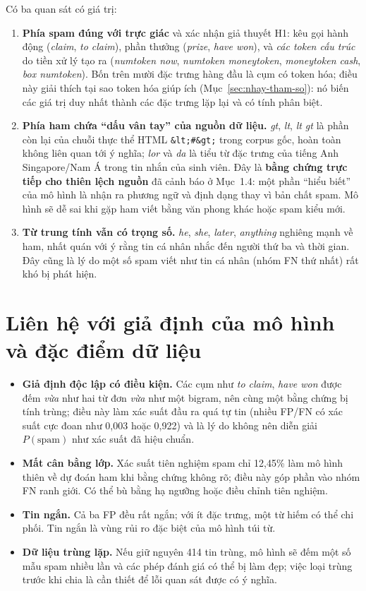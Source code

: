 Có ba quan sát có giá trị:

\begin{enumerate}[label=(\arabic*)]
    \item \textbf{Phía spam đúng với trực giác} và xác nhận giả thuyết H1: kêu gọi hành động (\textit{claim}, \textit{to claim}), phần thưởng (\textit{prize}, \textit{have won}), và \textit{các token cấu trúc} do tiền xử lý tạo ra (\textit{numtoken now}, \textit{numtoken moneytoken}, \textit{moneytoken cash}, \textit{box numtoken}). Bốn trên mười đặc trưng hàng đầu là cụm có token hóa; điều này giải thích tại sao token hóa giúp ích (Mục~\ref{sec:nhay-tham-so}): nó biến các giá trị duy nhất thành các đặc trưng lặp lại và có tính phân biệt.
    \item \textbf{Phía ham chứa ``dấu vân tay'' của nguồn dữ liệu.} \textit{gt}, \textit{lt}, \textit{lt gt} là phần còn lại của chuỗi thực thể HTML \texttt{\&lt;\#\&gt;} trong corpus gốc, hoàn toàn không liên quan tới ý nghĩa; \textit{lor} và \textit{da} là tiểu từ đặc trưng của tiếng Anh Singapore/Nam Á trong tin nhắn của sinh viên. Đây là \textbf{bằng chứng trực tiếp cho thiên lệch nguồn} đã cảnh báo ở Mục~1.4: một phần ``hiểu biết'' của mô hình là nhận ra phương ngữ và định dạng thay vì bản chất spam. Mô hình sẽ dễ sai khi gặp ham viết bằng văn phong khác hoặc spam kiểu mới.
    \item \textbf{Từ trung tính vẫn có trọng số.} \textit{he}, \textit{she}, \textit{later}, \textit{anything} nghiêng mạnh về ham, nhất quán với ý rằng tin cá nhân nhắc đến người thứ ba và thời gian. Đây cũng là lý do một số spam viết như tin cá nhân (nhóm FN thứ nhất) rất khó bị phát hiện.
\end{enumerate}

\section{Liên hệ với giả định của mô hình và đặc điểm dữ liệu}

\begin{itemize}
    \item \textbf{Giả định độc lập có điều kiện.} Các cụm như \textit{to claim}, \textit{have won} được đếm \textit{vừa} như hai từ đơn \textit{vừa} như một bigram, nên cùng một bằng chứng bị tính trùng; điều này làm xác suất đầu ra quá tự tin (nhiều FP/FN có xác suất cực đoan như 0,003 hoặc 0,922) và là lý do không nên diễn giải $P(\text{spam})$ như xác suất đã hiệu chuẩn.
    \item \textbf{Mất cân bằng lớp.} Xác suất tiên nghiệm spam chỉ 12,45\% làm mô hình thiên về dự đoán ham khi bằng chứng không rõ; điều này góp phần vào nhóm FN ranh giới. Có thể bù bằng hạ ngưỡng hoặc điều chỉnh tiên nghiệm.
    \item \textbf{Tin ngắn.} Cả ba FP đều rất ngắn; với ít đặc trưng, một từ hiếm có thể chi phối. Tin ngắn là vùng rủi ro đặc biệt của mô hình túi từ.
    \item \textbf{Dữ liệu trùng lặp.} Nếu giữ nguyên 414 tin trùng, mô hình sẽ đếm một số mẫu spam nhiều lần và các phép đánh giá có thể bị làm đẹp; việc loại trùng trước khi chia là cần thiết để lỗi quan sát được có ý nghĩa.
\end{itemize}

